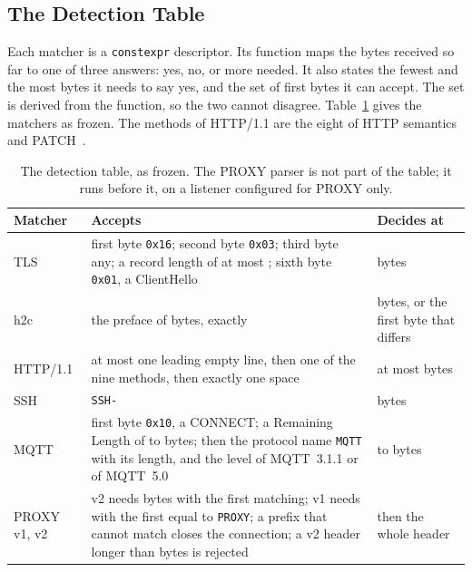 \subsection{The Detection Table}\label{sec:table}

Each matcher is a \texttt{constexpr} descriptor. Its function maps the bytes received so far to
one of three answers: yes, no, or more needed. It also states the fewest and the most bytes it
needs to say yes, and the set of first bytes it can accept. The set is derived from the function, so the two cannot
disagree. Table~\ref{tab:matchers} gives the matchers as frozen. The methods of HTTP/1.1 are the
eight of HTTP semantics~\cite{fielding2022rfc9110} and PATCH~\cite{dusseault2010rfc5789}.

\begin{table}[H]
\caption{The detection table, as frozen. The PROXY parser is not part of the table; it runs before
it, on a listener configured for PROXY only.\label{tab:matchers}}
\centering\small
\begin{tabularx}{\textwidth}{@{}l X l@{}}
\toprule
\textbf{Matcher} & \textbf{Accepts} & \textbf{Decides at} \\
\midrule
TLS & first byte \texttt{0x16}; second byte \texttt{0x03}; third byte any; a record length of at
most \TlsRecordMax{}; sixth byte \texttt{0x01}, a ClientHello~\cite{rescorla2018rfc8446} &
\TlsNeed{} bytes \\
h2c & the preface of \HtwocNeed{} bytes, exactly~\cite{thomson2022rfc9113} & \HtwocNeed{} bytes,
or the first byte that differs \\
HTTP/1.1 & at most one leading empty line, then one of the nine methods, then exactly one
space~\cite{fielding2022rfc9112} & at most \HttpNeedMax{} bytes \\
SSH & \texttt{SSH-}~\cite{ylonen2006rfc4253} & \SshNeed{} bytes \\
MQTT & first byte \texttt{0x10}, a CONNECT; a Remaining Length of \MqttRlMin{} to \MqttRlMax{}
bytes; then the protocol name \texttt{MQTT} with its length, and the level of MQTT~3.1.1 or of
MQTT~5.0~\cite{banks2014mqtt311,banks2019mqtt5} & \MqttNeedMin{} to \MqttNeedMax{} bytes \\
PROXY v1, v2 & v2 needs \ProxyVtwoNeed{} bytes with the first \ProxyVtwoMatch{} matching; v1
needs \ProxyVoneNeed{} with the first \ProxyVoneMatch{} equal to \texttt{PROXY}; a prefix that
cannot match closes the connection; a v2 header longer than \ProxyVtwoMax{} bytes is
rejected~\cite{tarreau2026proxy} & then the whole header \\
\bottomrule
\end{tabularx}
\end{table}

